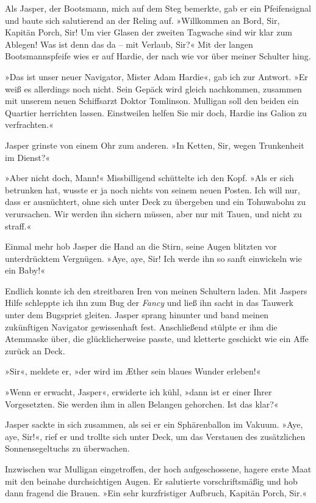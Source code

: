 Als Jasper, der Bootsmann, mich auf dem Steg bemerkte, gab er ein
Pfeifensignal und baute sich salutierend an der Reling auf.
»Willkommen an Bord, Sir, Kapitän Porch, Sir! Um vier Glasen der
zweiten Tagwache sind wir klar zum Ablegen! Was ist denn das da –
mit Verlaub, Sir?« Mit der langen Bootsmannspfeife wies er auf
Hardie, der nach wie vor über meiner Schulter hing.

»Das ist unser neuer Navigator, Mister Adam Hardie«, gab ich zur
Antwort. »Er weiß es allerdings noch nicht. Sein Gepäck wird gleich
nachkommen, zusammen mit unserem neuen Schiffsarzt Doktor
Tomlinson. Mulligan soll den beiden ein Quartier herrichten lassen.
Einstweilen helfen Sie mir doch, Hardie ins Galion zu
verfrachten.«

Jasper grinste von einem Ohr zum anderen. »In Ketten, Sir, wegen
Trunkenheit im Dienst?«

»Aber nicht doch, Mann!« Missbilligend schüttelte ich den Kopf.
»Als er sich betrunken hat, wusste er ja noch nichts von seinem
neuen Posten. Ich will nur, dass er ausnüchtert, ohne sich unter
Deck zu übergeben und ein Tohuwabohu zu verursachen. Wir werden ihn
sichern müssen, aber nur mit Tauen, und nicht zu straff.«

Einmal mehr hob Jasper die Hand an die Stirn, seine Augen blitzten
vor unterdrücktem Vergnügen. »Aye, aye, Sir! Ich werde ihn so sanft
einwickeln wie ein Baby!«

\bigpar

Endlich konnte ich den streitbaren Iren von meinen Schultern laden.
Mit Jaspers Hilfe schleppte ich ihn zum Bug der \emph{Fancy} und
ließ ihn sacht in das Tauwerk unter dem Bugspriet gleiten. Jasper
sprang hinunter und band meinen zukünftigen Navigator gewissenhaft
fest. Anschließend stülpte er ihm die Atemmaske über, die
glücklicherweise passte, und kletterte geschickt wie ein Affe
zurück an Deck.

»Sir«, meldete er, »der wird im Æther sein blaues Wunder erleben!«

»Wenn er erwacht, Jasper«, erwiderte ich kühl, »dann ist er einer
Ihrer Vorgesetzten. Sie werden ihm in allen Belangen gehorchen. Ist
das klar?«

Jasper sackte in sich zusammen, als sei er ein Sphärenballon im
Vakuum. »Aye, aye, Sir!«, rief er und trollte sich unter Deck, um
das Verstauen des zusätzlichen Sonnensegeltuchs zu überwachen.

Inzwischen war Mulligan eingetroffen, der hoch aufgeschossene,
hagere erste Maat mit den beinahe durchsichtigen Augen. Er
salutierte vorschriftsmäßig und hob dann fragend die Brauen. »Ein
sehr kurzfristiger Aufbruch, Kapitän Porch, Sir.«

